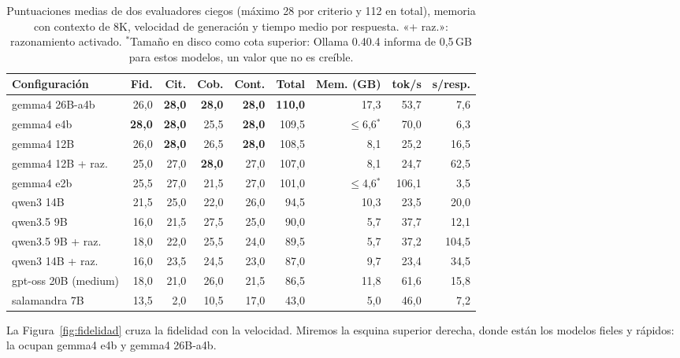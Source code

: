 \documentclass{article}
\begin{document}
\begin{table}[t]
  \caption{Puntuaciones medias de dos evaluadores ciegos (máximo 28 por
  criterio y 112 en total), memoria con contexto de 8K, velocidad de
  generación y tiempo medio por respuesta. «+ raz.»: razonamiento activado.
  $^{*}$Tamaño en disco como cota superior: Ollama 0.40.4 informa de 0,5\,GB
  para estos modelos, un valor que no es creíble.}
  \label{tab:resultados}
  \centering
  \small
  \begin{tabular}{lrrrrrrrr}
    \toprule
    Configuración & Fid. & Cit. & Cob. & Cont. & Total & Mem. (GB) & tok/s & s/resp. \\
    \midrule
    gemma4 26B-a4b           & 26,0 & \textbf{28,0} & \textbf{28,0} & \textbf{28,0} & \textbf{110,0} & 17,3 & 53,7 & 7,6 \\
    gemma4 e4b               & \textbf{28,0} & \textbf{28,0} & 25,5 & \textbf{28,0} & 109,5 & $\le$6,6$^{*}$ & 70,0 & 6,3 \\
    gemma4 12B               & 26,0 & \textbf{28,0} & 26,5 & \textbf{28,0} & 108,5 & 8,1 & 25,2 & 16,5 \\
    gemma4 12B + raz.        & 25,0 & 27,0 & \textbf{28,0} & 27,0 & 107,0 & 8,1 & 24,7 & 62,5 \\
    gemma4 e2b               & 25,5 & 27,0 & 21,5 & 27,0 & 101,0 & $\le$4,6$^{*}$ & 106,1 & 3,5 \\
    \midrule
    qwen3 14B                & 21,5 & 25,0 & 22,0 & 26,0 & 94,5 & 10,3 & 23,5 & 20,0 \\
    qwen3.5 9B               & 16,0 & 21,5 & 27,5 & 25,0 & 90,0 & 5,7 & 37,7 & 12,1 \\
    qwen3.5 9B + raz.        & 18,0 & 22,0 & 25,5 & 24,0 & 89,5 & 5,7 & 37,2 & 104,5 \\
    qwen3 14B + raz.         & 16,0 & 23,5 & 24,5 & 23,0 & 87,0 & 9,7 & 23,4 & 34,5 \\
    \midrule
    gpt-oss 20B (medium)     & 18,0 & 21,0 & 26,0 & 21,5 & 86,5 & 11,8 & 61,6 & 15,8 \\
    salamandra 7B            & 13,5 &  2,0 & 10,5 & 17,0 & 43,0 & 5,0 & 46,0 & 7,2 \\
    \bottomrule
  \end{tabular}
\end{table}

La Figura~\ref{fig:fidelidad} cruza la fidelidad con la velocidad. Miremos la
esquina superior derecha, donde están los modelos fieles y rápidos: la
ocupan gemma4 e4b y gemma4 26B-a4b.
\end{document}
